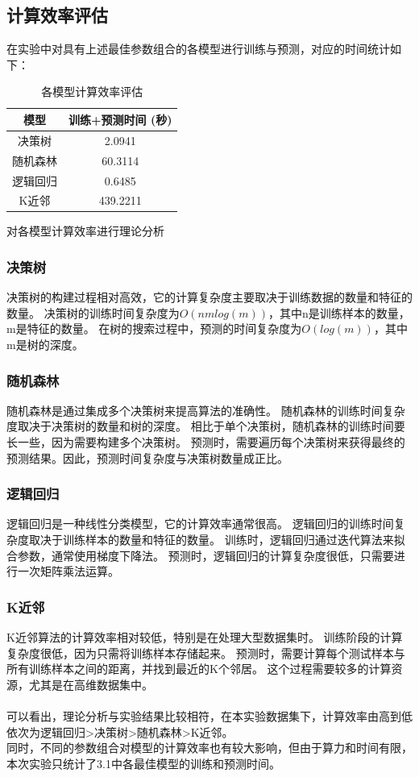\documentclass[12pt,a4paper]{article}
\begin{document}
\subsection{计算效率评估}
在实验中对具有上述最佳参数组合的各模型进行训练与预测，对应的时间统计如下：
\begin{table}[H]
    \centering
    \caption{各模型计算效率评估}
    \label{tab:efficiency}
    \begin{tabular}{cc}
      \toprule
      模型 & 训练+预测时间 (秒)\\
      \midrule
      决策树 & 2.0941\\
      随机森林 & 60.3114\\
      逻辑回归 & 0.6485\\
      K近邻 & 439.2211\\
      \bottomrule
    \end{tabular}
\end{table}
对各模型计算效率进行理论分析
\subsubsection{决策树}
决策树的构建过程相对高效，它的计算复杂度主要取决于训练数据的数量和特征的数量。
决策树的训练时间复杂度为$O(nmlog(m))$，其中n是训练样本的数量，m是特征的数量。
在树的搜索过程中，预测的时间复杂度为$O(log(m))$，其中m是树的深度。
\subsubsection{随机森林}
随机森林是通过集成多个决策树来提高算法的准确性。
随机森林的训练时间复杂度取决于决策树的数量和树的深度。
相比于单个决策树，随机森林的训练时间要长一些，因为需要构建多个决策树。
预测时，需要遍历每个决策树来获得最终的预测结果。因此，预测时间复杂度与决策树数量成正比。
\subsubsection{逻辑回归}
逻辑回归是一种线性分类模型，它的计算效率通常很高。
逻辑回归的训练时间复杂度取决于训练样本的数量和特征的数量。
训练时，逻辑回归通过迭代算法来拟合参数，通常使用梯度下降法。
预测时，逻辑回归的计算复杂度很低，只需要进行一次矩阵乘法运算。
\subsubsection{K近邻}
K近邻算法的计算效率相对较低，特别是在处理大型数据集时。
训练阶段的计算复杂度很低，因为只需将训练样本存储起来。
预测时，需要计算每个测试样本与所有训练样本之间的距离，并找到最近的K个邻居。
这个过程需要较多的计算资源，尤其是在高维数据集中。\\
\\
可以看出，理论分析与实验结果比较相符，在本实验数据集下，计算效率由高到低依次为逻辑回归>决策树>随机森林>K近邻。\\
同时，不同的参数组合对模型的计算效率也有较大影响，但由于算力和时间有限，本次实验只统计了3.1中各最佳模型的训练和预测时间。
\end{document}
